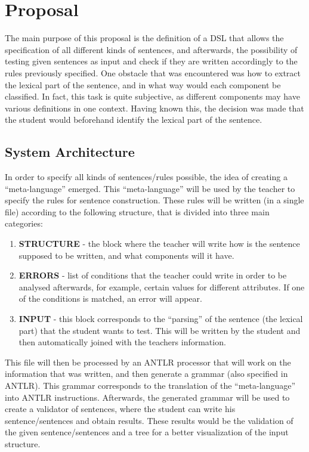 \chapter{Proposal} \label{proposal}

The main purpose of this proposal is the definition of a \textsc{DSL} that allows the specification of all different kinds of sentences, and afterwards, the possibility of testing given sentences as input and check if they are written accordingly to the rules previously specified. One obstacle that was encountered was how to extract the lexical part of the sentence, and in what way would each component be classified. In fact, this task is quite subjective, as different components may have various definitions in one context. %
Having known this, the decision was made that the student would beforehand identify the lexical part of the sentence.

\section{System Architecture}
In order to specify all kinds of sentences/rules possible, the idea of creating a ``meta-language'' emerged. This ``meta-language'' will be used by the teacher to specify the rules for sentence construction. 
These rules will be written (in a single file) according to the following structure, that is divided into three main categories:

\begin{enumerate}
    \item \textbf{STRUCTURE} - the block where the teacher will write how is the sentence supposed to be written, and what components will it have.
    
    \item \textbf{ERRORS} - list of conditions that the teacher could write in order to be analysed afterwards, for example, certain values for different attributes. If one of the conditions is matched, an error will appear.
    
    \item \textbf{INPUT} - this block corresponds to the ``parsing'' of the sentence (the lexical part) that the student wants to test. This will be written by the student and then automatically joined with the teachers information.
\end{enumerate}

This file will then be processed by an \textsc{ANTLR} processor that will work on the information that was written, and then generate a grammar (also specified in \textsc{ANTLR}). This grammar corresponds to the translation of the
``meta-language'' into \textsc{ANTLR} instructions. Afterwards, the generated grammar will be used to create a validator of sentences, where the student can write his sentence/sentences and obtain results. 
These results would be the validation of the given sentence/sentences and a tree for a better visualization of the input structure.

